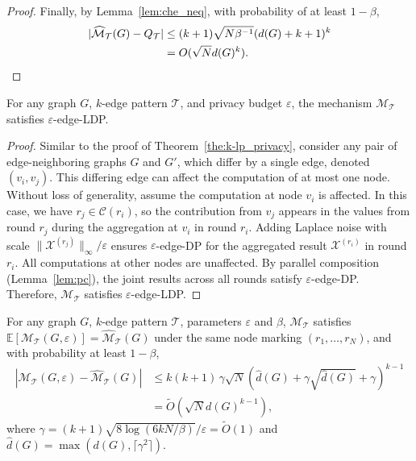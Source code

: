 \begin{proof}
Finally, by Lemma~\ref{lem:che_neq}, with probability of at least $1 - \beta$, 
\begin{align*}
   |\widehat{\mathcal{M}}_\mathcal{T}(G)- Q_\mathcal{T}| &\leq
    (k+1) \sqrt{N\beta^{-1}}(d(G)+k+1)^k\\
    &= O(\sqrt{N} d(G)^k)
 .  \qedhere
\end{align*}
 
\end{proof}



\begin{theorem}
For any graph $G$, $k$-edge pattern $\mathcal{T}$, and privacy budget $\varepsilon$, 
the mechanism $\mathcal{M}_\mathcal{T}$ satisfies $\varepsilon$-edge-LDP.
\end{theorem}


\begin{proof}
Similar to the proof of Theorem~\ref{the:k-lp_privacy}, consider any pair of edge-neighboring graphs $G$ and $G'$, which differ by a single edge, denoted $(v_i, v_j)$. 
This differing edge can affect the computation of at most one node.
Without loss of generality, assume the computation at node $v_i$ is affected. 
In this case, we have $r_j \in \mathcal{C}(r_i)$, so the contribution from $v_j$ appears in the values from round $r_j$ during the aggregation at $v_i$ in round $r_i$. Adding Laplace noise with scale $\|\mathcal{X}^{(r_j)}\|_\infty / \varepsilon$ ensures $\varepsilon$-edge-DP for the aggregated result $\mathcal{X}^{(r_i)}$ in round $r_i$.
All computations at other nodes are unaffected.
By parallel composition (Lemma~\ref{lem:pc}), the joint results across all rounds satisfy $\varepsilon$-edge-DP. 
Therefore, $\mathcal{M}_\mathcal{T}$ satisfies $\varepsilon$-edge-LDP.
\end{proof}



\begin{lemma}
    For any graph $G$, $k$-edge pattern $\mathcal{T}$, parameters $\varepsilon$ and $\beta$, 
$\mathcal{M}_{\mathcal{T}}$ satisfies
$\mathbb{E}[\mathcal{M}_{\mathcal{T}}(G, \varepsilon)] = 
    \widehat{\mathcal{M}}_{\mathcal{T}}(G)$ 
under the same node marking $(r_1, \dots, r_N)$, 
and with probability at least $1 - \beta$,
\begin{align*}
    |\mathcal{M}_{\mathcal{T}}(G, \varepsilon) - 
    \widehat{\mathcal{M}}_{\mathcal{T}}(G)| 
    &\leq 
    {k(k+1)} \,
    \gamma
    \sqrt{N}
    (\hat{d}(G) + \gamma \sqrt{\hat{d}(G)} + \gamma)^{k-1} 
    \\
    &=  \tilde{O}(\sqrt{N} d(G)^{k-1}),
\end{align*}
where $\gamma = (k{+}1)\sqrt{8\log(6kN/\beta)}/\varepsilon = \tilde{O}(1) $ and $\hat{d}(G) = \max(d(G), \lceil \gamma^2 \rceil)$.
\end{lemma}




